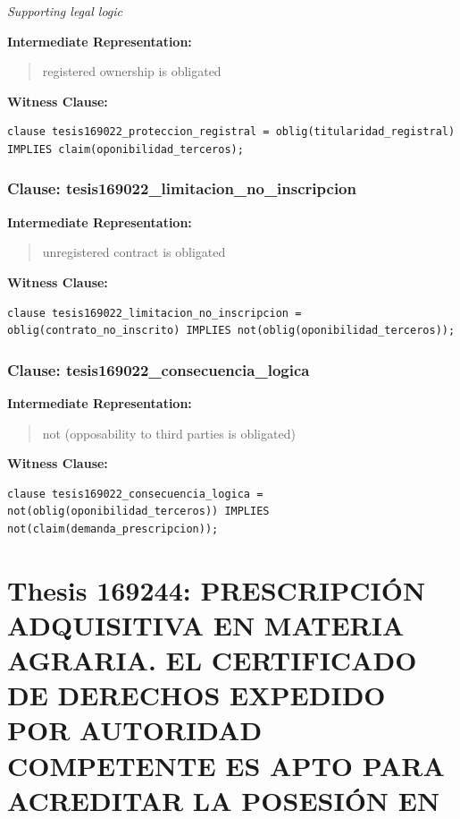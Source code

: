 \documentclass[11pt,a4paper]{article}
\begin{document}
\textit{Supporting legal logic}

\textbf{Intermediate Representation:}

\begin{quote}
registered ownership is obligated
\end{quote}

\textbf{Witness Clause:}

\begin{lstlisting}[style=witnessstyle, language=Witness]
clause tesis169022_proteccion_registral = oblig(titularidad_registral) IMPLIES claim(oponibilidad_terceros);
\end{lstlisting}

\subsubsection{Clause: tesis169022\_limitacion\_no\_inscripcion}

\textbf{Intermediate Representation:}

\begin{quote}
unregistered contract is obligated
\end{quote}

\textbf{Witness Clause:}

\begin{lstlisting}[style=witnessstyle, language=Witness]
clause tesis169022_limitacion_no_inscripcion = oblig(contrato_no_inscrito) IMPLIES not(oblig(oponibilidad_terceros));
\end{lstlisting}

\subsubsection{Clause: tesis169022\_consecuencia\_logica}

\textbf{Intermediate Representation:}

\begin{quote}
not (opposability to third parties is obligated)
\end{quote}

\textbf{Witness Clause:}

\begin{lstlisting}[style=witnessstyle, language=Witness]
clause tesis169022_consecuencia_logica = not(oblig(oponibilidad_terceros)) IMPLIES not(claim(demanda_prescripcion));
\end{lstlisting}

\newpage

\section{Thesis 169244: PRESCRIPCIÓN ADQUISITIVA EN MATERIA AGRARIA. EL CERTIFICADO DE DERECHOS EXPEDIDO POR AUTORIDAD COMPETENTE ES APTO PARA ACREDITAR LA POSESIÓN EN}
\label{thesis:169244}
\end{document}
